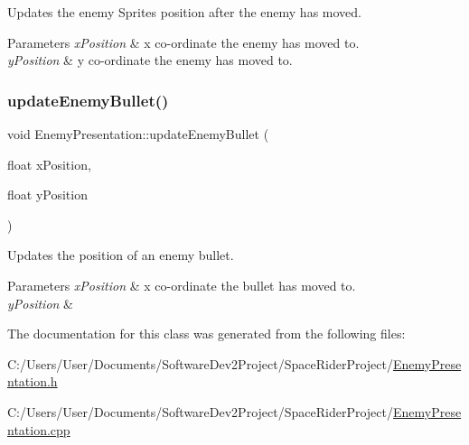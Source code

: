 Updates the enemy Sprite\textquotesingle{}s position after the enemy has moved. 


\begin{DoxyParams}{Parameters}
{\em x\+Position} & x co-\/ordinate the enemy has moved to. \\
\hline
{\em y\+Position} & y co-\/ordinate the enemy has moved to. \\
\hline
\end{DoxyParams}
\mbox{\label{class_enemy_presentation_ad7d1f196be857ea51b2ced17b5199b40}} 
\subsubsection{\texorpdfstring{update\+Enemy\+Bullet()}{updateEnemyBullet()}}
{\footnotesize\ttfamily void Enemy\+Presentation\+::update\+Enemy\+Bullet (\begin{DoxyParamCaption}\item[{float}]{x\+Position,  }\item[{float}]{y\+Position }\end{DoxyParamCaption})}



Updates the position of an enemy bullet. 


\begin{DoxyParams}{Parameters}
{\em x\+Position} & x co-\/ordinate the bullet has moved to. \\
\hline
{\em y\+Position} & \\
\hline
\end{DoxyParams}


The documentation for this class was generated from the following files\+:\begin{DoxyCompactItemize}
\item 
C\+:/\+Users/\+User/\+Documents/\+Software\+Dev2\+Project/\+Space\+Rider\+Project/\hyperlink{_enemy_presentation_8h}{Enemy\+Presentation.\+h}\item 
C\+:/\+Users/\+User/\+Documents/\+Software\+Dev2\+Project/\+Space\+Rider\+Project/\hyperlink{_enemy_presentation_8cpp}{Enemy\+Presentation.\+cpp}\end{DoxyCompactItemize}
